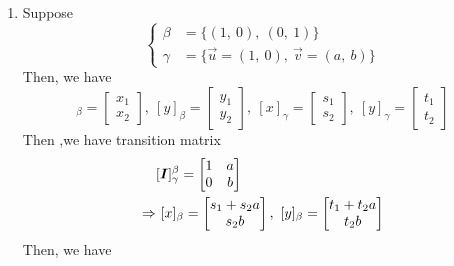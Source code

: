 \documentclass[a4paper,12pt]{article}
\begin{document}
\begin{enumerate}
    \item Suppose \begin{equation}
        \begin{cases}
            \beta & = \{(1, \ 0), \ (0, \ 1)\} \\
            \gamma & = \{\vec{u} = (1, \ 0), \ \vec{v} = (a, \ b)\}
        \end{cases}
    \end{equation} Then, we have \begin{equation}
        [x]_{\beta} = \begin{bmatrix}
            x_1 \\
            x_2
        \end{bmatrix}, \ [y]_{\beta} = \begin{bmatrix}
            y_1 \\
            y_2
        \end{bmatrix}, \ [x]_{\gamma} = \begin{bmatrix}
            s_1 \\
            s_2
        \end{bmatrix}, \ [y]_{\gamma} = \begin{bmatrix}
            t_1 \\
            t_2
        \end{bmatrix}
    \end{equation} Then ,we have transition matrix \begin{equation}
        \begin{aligned}
            & [\boldsymbol{I}]_{\gamma}^{\beta} = \begin{bmatrix}
                1 & a \\
                0 & b
            \end{bmatrix} \\
            \Rightarrow & \ [x]_{\beta} = \begin{bmatrix}
                s_1 + s_2a \\
                s_2b
            \end{bmatrix}, \ [y]_{\beta} = \begin{bmatrix}
                t_1 + t_2a \\
                t_2b
            \end{bmatrix}
        \end{aligned}
    \end{equation} Then, we have \begin{equation}
        \begin{aligned}

\end{aligned}
\end{equation}
\end{enumerate}
\end{document}
